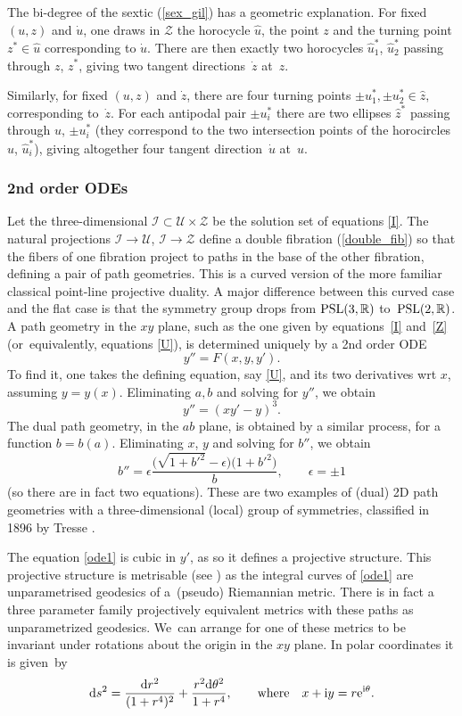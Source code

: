 \documentclass[pdftex]{sigma}%
\numberwithin{equation}{section}
\newcommand{\Z}{\mathbb{Z}}
\newcommand{\R}{\mathbb{R}}
\def\be{\begin{equation}}
\def\ee{\end{equation}}
\renewcommand{\Z}{\mathcal{Z}}
\newcommand{\U}{\mathcal{U}}
\newcommand{\cI}{{\mathcal I}}
\newcommand{\uh}{\widehat{u}}
\newcommand{\zh}{\widehat{z}}
\begin{document}
The bi-degree of the sextic
(\ref{sex_gil}) has a geometric explanation. For fixed $(u,z)$ and $\dot u$, one draws in $\Z$ the horocycle $\uh$, the point $z$ and the turning point $z^*\in\uh$ corresponding to $\dot u$. There are then exactly two horocycles $\uh_1^*$, $\uh_2^*$ passing through $z$, $z^*$, giving two
tangent directions~$\dot z$ at~$z$.

Similarly, for fixed $(u,z)$ and $\dot z$, there are four turning points $\pm u_1^*, \pm u_2^*\in \zh,$ corresponding to~$\dot z$. For each antipodal pair $\pm u_i^*$ there are two ellipses $\zh^*$ passing through $u$, $\pm u_i^*$ (they correspond to the two intersection points of the horocircles $\uh$, $\uh^*_i$), giving altogether four tangent direction~$\dot u$ at~$u$.

 \subsubsection{2nd order ODEs}
Let the three-dimensional
$\cI\subset \U\times\Z$ be the solution set of equations \eqref{I}. The natural projections $\cI\to\U$, $\cI\to\Z$ define a double fibration (\ref{double_fib})
so that the fibers of one fibration project to paths in the base of the other fibration,
defining a pair of path geometries. This is a curved version of the more familiar
classical point-line projective duality.
A major difference between this curved case and the flat case is
that the symmetry group drops from ${\rm PSL}(3, \R)$ to~${\rm PSL}(2, \R)$.
A path geometry in the $xy$ plane, such as the one given by equations~\eqref{I} and~\eqref{Z} (or~equivalently, equations \eqref{U}),
is determined uniquely by a 2nd order ODE
\[
y''=F(x,y,y').
\]
To find it, one takes the defining equation, say \eqref{U},
and its two derivatives wrt $x$, assuming $y=y(x)$.
Eliminating $a, b$ and solving for $y''$, we obtain
\be\label{ode1}
y''=(xy'-y)^3.
\ee
The dual path geometry, in the $ab$ plane, is obtained by a similar process, for a function $b=b(a)$.
Eliminating $x$, $y$ and solving for $b''$, we obtain
\[
b''=\epsilon\frac{\big(\sqrt{1+b'^2}-\epsilon\big)\big(1+b'^2\big)}{b}, \qquad \epsilon=\pm 1
\]
(so there are in fact two equations).
These are two examples of (dual) 2D path geometries with a three-dimensional
(local) group of symmetries, classified in 1896 by Tresse \cite[p.~76]{Tr}.

The equation \eqref{ode1} is cubic in $y'$, as so it defines a projective structure. This projective structure is metrisable (see \cite{BDE}) as the integral
curves of \eqref{ode1} are unparametrised geodesics
of a~(pseudo) Riemannian metric. There is in fact a three parameter family projectively equivalent metrics with these paths as unparametrized geodesics. We~can arrange for one of these metrics to be invariant under rotations about the origin in the $xy$ plane. In polar coordinates it is given~by
\[
{\rm d}s^2=\frac{{\rm d}r^2}{(1+r^4)^2}+\frac{r^2{\rm d}\theta^2}{1+r^4}, \qquad
\text{where}\quad x+{\rm i}y=r{\rm e}^{{\rm i}\theta}.
\]
\end{document}
